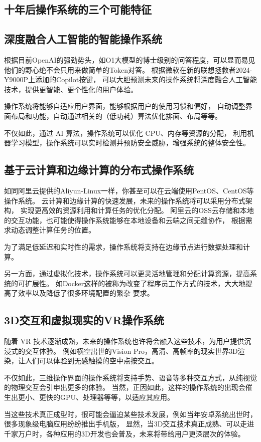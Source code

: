 \documentclass[UTF8]{homework.cls}
\begin{document}
\begin{homeworkProblem}

\section{十年后操作系统的三个可能特征}

\subsection{深度融合人工智能的智能操作系统}

根据目前OpenAI的强劲势头，如O1大模型的博士级别的问答程度，可以显而易见他们的野心绝不会只用来做简单的Token对答。
根据微软在新的联想拯救者2024-Y9000P上添加的Copilot按键，
可以大胆预测未来的操作系统将深度融合人工智能技术，提供更智能、更个性化的用户体验。

操作系统将能够自适应用户界面，能够根据用户的使用习惯和偏好，
自动调整界面布局和功能，自动通过相关的（低功耗）算法优化排面、布局等等。

不仅如此，通过 AI 算法，操作系统可以优化 CPU、内存等资源的分配，
利用机器学习模型，操作系统可以实时检测并预防安全威胁，增强系统的整体安全性。

\subsection{基于云计算和边缘计算的分布式操作系统}

如同阿里云提供的Aliyun-Linux一样，你甚至可以在云端使用PentOS、CentOS等操作系统。
云计算和边缘计算的快速发展，未来的操作系统将可以采用分布式架构，\cite{satyanarayanan2017emergence}
实现更高效的资源利用和计算任务的优化分配。
阿里云的OSS云存储和本地的交互功能，也可能使得操作系统能够在本地设备和云端之间无缝协作，
根据需求动态调整计算任务的位置。

为了满足低延迟和实时性的需求，操作系统将支持在边缘节点进行数据处理和计算。

另一方面，通过虚拟化技术，操作系统可以更灵活地管理和分配计算资源，提高系统的可扩展性。
如Docker这样的被称为改变了程序员工作方式的技术，大大地提高了效率以及降低了很多环境配置的繁杂
要求。

\subsection{3D交互和虚拟现实的VR操作系统}

随着 VR 技术逐渐成熟，未来的操作系统也许将会融入这些技术，为用户提供沉浸式的交互体验。
例如横空出世的Vision Pro，高清、高帧率的现实世界3D渲染，让人们可以体验到无感触摸的空中点按交互。

不仅如此，三维操作界面的操作系统将支持手势、语音等多种交互方式，从纯视觉的物理交互会引申出更多的体验。
当然，正因如此，这样的操作系统的出现会催生出更小、更快的GPU、处理器等等，以适应其应用。

当这些技术真正成型时，很可能会逼迫某些技术发展，例如当年安卓系统出世时，很多现象级电脑应用纷纷推出手机版，
显然，当3D交互技术真正成熟、可以走进千家万户时，各种应用的3D开发也会普及，未来将带给用户更深层次的体验。

\end{homeworkProblem}



\end{document}
